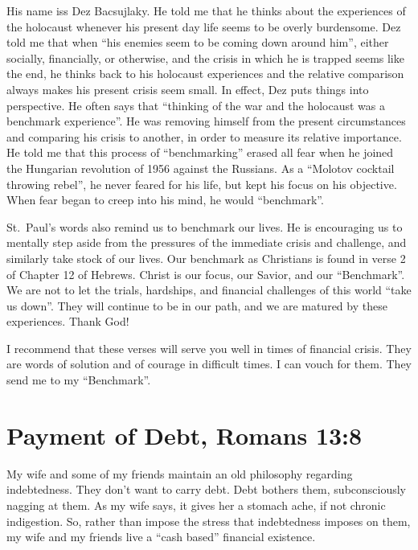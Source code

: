 \documentclass[12pt]{memoir}
\begin{document}
His name iss Dez Bacsujlaky. He told me that he thinks about the experiences of the holocaust whenever his present day life seems to be overly burdensome. Dez told me that when ``his enemies seem to be coming down around him'', either socially, financially, or otherwise, and the crisis in which he is trapped seems like the end, he thinks back
to his holocaust experiences and the relative comparison always makes his present crisis seem small. In effect, Dez puts things into perspective. He often says that ``thinking of the war and the
holocaust was a benchmark experience''. He was removing himself from the present circumstances and comparing his crisis to another, in order to
measure its relative importance. He told me that this process of ``benchmarking'' erased all fear when he joined the Hungarian revolution of 1956 against the Russians. As a ``Molotov cocktail throwing rebel'', he never feared for his life, but kept his focus on his objective. When fear began to creep into his mind, he would ``benchmark''.

St.~Paul's words also remind us to benchmark our lives. He is encouraging us to mentally step aside from the pressures of the immediate crisis and challenge, and similarly take stock of our lives. Our benchmark as Christians is found in verse 2 of Chapter 12 of Hebrews. Christ is our focus, our Savior, and our ``Benchmark''. We are not to let the trials, hardships, and financial challenges of this world ``take us down''. They will continue to be in our path, and we are matured
by these experiences. Thank God! 

I recommend that these verses will serve you well in times of financial crisis. They are words of solution and of courage in difficult times. I can vouch for them. They send me to my ``Benchmark''.

\section[Payment of Debt]{Payment of Debt, Romans 13:8}

My wife and some of my friends maintain an old philosophy regarding
indebtedness. They don't want to carry debt. Debt bothers them, subconsciously
nagging at them. As my wife says, it gives her a stomach ache, if
not chronic indigestion. So, rather than impose the stress that indebtedness
imposes on them, my wife and my friends live a ``cash based'' financial
existence.
\end{document}
